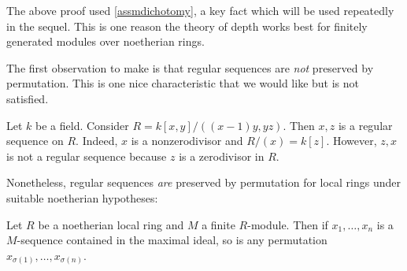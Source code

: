 The above proof used \cref{assmdichotomy}, a key fact which will be used
repeatedly in the sequel.
This is one reason the theory of depth works best for finitely generated
modules over noetherian rings.

The first observation to make is that regular sequences are \textit{not}
preserved by permutation. This is one nice characteristic that we would like
but is not satisfied.

\begin{example} Let $k $ be a field.
Consider $R=k[x,y]/((x-1)y, yz)$. Then $x,z$ is a regular sequence on $R$. Indeed,
$x$ is a nonzerodivisor and $R/(x) = k[z]$.  However, $z,
x$ is not a regular sequence because $z$ is a zerodivisor in $R$.
\end{example} 

Nonetheless, regular sequences \emph{are} preserved by permutation for local rings under
suitable noetherian hypotheses: 
\begin{proposition} 
Let $R$ be a noetherian local ring and $M$ a finite $R$-module. Then if $x_1,
\dots, x_n$ is a $M$-sequence contained in the maximal ideal, so is any permutation $x_{\sigma(1)}, \dots,
x_{\sigma(n)}$.
\end{proposition} 

